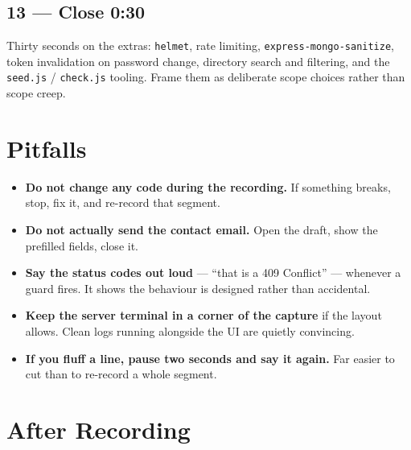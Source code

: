 \documentclass[11pt,letterpaper]{article}
\begin{document}
\subsection*{13 --- Close \hfill \normalfont\small 0:30}

Thirty seconds on the extras: \texttt{helmet}, rate limiting,
\texttt{express-mongo-sanitize}, token invalidation on password change,
directory search and filtering, and the \texttt{seed.js} / \texttt{check.js}
tooling. Frame them as deliberate scope choices rather than scope creep.

\section{Pitfalls}

\begin{itemize}
  \item \textbf{Do not change any code during the recording.} If something
        breaks, stop, fix it, and re-record that segment.
  \item \textbf{Do not actually send the contact email.} Open the draft,
        show the prefilled fields, close it.
  \item \textbf{Say the status codes out loud} --- ``that is a 409
        Conflict'' --- whenever a guard fires. It shows the behaviour is
        designed rather than accidental.
  \item \textbf{Keep the server terminal in a corner of the capture} if the
        layout allows. Clean logs running alongside the UI are quietly
        convincing.
  \item \textbf{If you fluff a line, pause two seconds and say it again.}
        Far easier to cut than to re-record a whole segment.
\end{itemize}

\section{After Recording}
\end{document}
